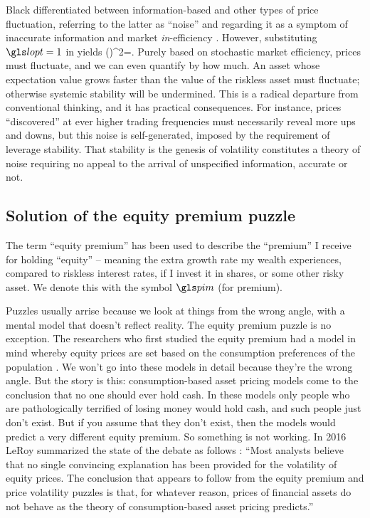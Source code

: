 Black differentiated between information-based and other types of price fluctuation, referring to the latter as ``noise'' and regarding it as a symptom of inaccurate information and market {\it in}-efficiency \cite{Black1986}. However, substituting $\lopt=1$ in  yields 
\be
{}
\left(\sigmas\right)^2=\mue.
\ee
Purely based on stochastic market efficiency, prices must fluctuate, and we can even quantify by how much. An asset whose expectation value grows faster than the value of the riskless asset must fluctuate; otherwise systemic stability will be undermined.
This is a radical departure from conventional thinking, and it has practical consequences. For instance, prices ``discovered'' at ever higher trading frequencies must necessarily reveal more ups and downs, but this noise is self-generated, imposed by the requirement of leverage stability. That stability is the genesis of volatility constitutes a theory of noise requiring no appeal to the arrival of unspecified information, accurate or not.

\subsection{Solution of the equity premium puzzle}
The term ``equity premium'' has been used to describe the ``premium'' I receive for holding ``equity'' -- meaning the extra growth rate my wealth experiences, compared to riskless interest rates, if I invest it in shares, or some other risky asset. We denote this with the symbol $\pim$ (for premium). 

Puzzles usually arrise because we look at things from the wrong angle, with a mental model that doesn't reflect reality. The equity premium puzzle is no exception. The researchers who first studied the equity premium had a model in mind whereby equity prices are set based on the consumption preferences of the population \cite{MehraPrescott1985}. 
We won't go into these models in detail because they're the wrong angle. But the story is this: consumption-based asset pricing models come to the conclusion that no one should ever hold cash. In these models only people who are pathologically terrified of losing money would hold cash, and such people just don't exist. But if you assume that they don't exist, then the models would predict a very different equity premium. So something is not working.
In 2016 LeRoy summarized the state of the debate as follows \cite{LeRoy2016}: ``Most analysts believe that no single convincing explanation has been provided for the volatility of equity prices. The conclusion that appears to follow from the equity premium and price volatility puzzles is that, for whatever reason, prices of financial assets do not behave as the theory of consumption-based asset pricing predicts.''

